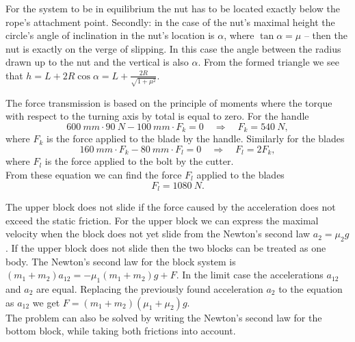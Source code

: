 \documentclass[11pt]{article}
\begin{document}

\solueng
For the system to be in equilibrium the nut has to be located exactly below the rope’s attachment point. Secondly: in the case of the nut’s maximal height the circle’s angle of inclination in the nut’s location is $\alpha$, where $\tan \alpha = \mu$ – then the nut is exactly on the verge of slipping. In this case the angle between the radius drawn up to the nut and the vertical is also $\alpha$. From the formed triangle we see that $h=L+2R\cos \alpha = L+ \frac{2R}{\sqrt{1+\mu^2}}$.
\probend
\bigskip


\solueng
The force transmission is based on the principle of moments where the torque with respect to the turning axis by total is equal to zero. For the handle
\[ \SI{600}{mm}\cdot\SI{90}{N}-\SI{100}{mm}\cdot F_k = 0 \quad\Rightarrow\quad F_k = \SI{540}{N}, \]
where $F_k$ is the force applied to the blade by the handle. Similarly for the blades
\[ \SI{160}{mm}\cdot F_k - \SI{80}{mm}\cdot F_l = 0 \quad\Rightarrow\quad F_l = 2F_k, \]
where $F_l$ is the force applied to the bolt by the cutter.\\
From these equation we can find the force $F_l$ applied to the blades
\[ F_l = \SI{1080}{N}.\]
\probend
\bigskip


\solueng
The upper block does not slide if the force caused by the acceleration does not exceed the static friction. For the upper block we can express the maximal velocity when the block does not yet slide from the Newton’s second law $a_2=\mu_2g$. If the upper block does not slide then the two blocks can be treated as one body. The Newton’s second law for the block system is $(m_1+m_2)a_{12} = -\mu_1 (m_1+m_2)g+F$. In the limit case the accelerations $a_{12}$ and $a_2$ are equal. Replacing the previously found acceleration $a_2$ to the equation as $a_{12}$ we get $F=(m_1+m_2)(\mu_1+\mu_2)g$.\\
The problem can also be solved by writing the Newton’s second law for the bottom block, while taking both frictions into account.
\probend
\bigskip
\end{document}
